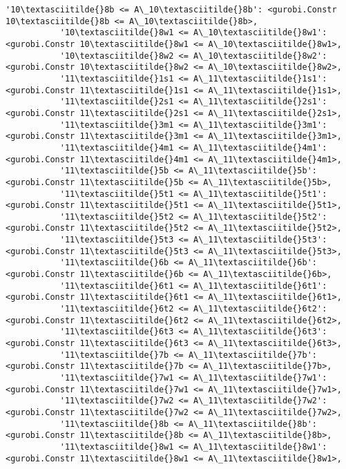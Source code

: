 \documentclass[11pt]{article}
\begin{document}
\begin{Verbatim}[commandchars=\\\{\}]
           '10\textasciitilde{}8b <= A\_10\textasciitilde{}8b': <gurobi.Constr 10\textasciitilde{}8b <= A\_10\textasciitilde{}8b>,
           '10\textasciitilde{}8w1 <= A\_10\textasciitilde{}8w1': <gurobi.Constr 10\textasciitilde{}8w1 <= A\_10\textasciitilde{}8w1>,
           '10\textasciitilde{}8w2 <= A\_10\textasciitilde{}8w2': <gurobi.Constr 10\textasciitilde{}8w2 <= A\_10\textasciitilde{}8w2>,
           '11\textasciitilde{}1s1 <= A\_11\textasciitilde{}1s1': <gurobi.Constr 11\textasciitilde{}1s1 <= A\_11\textasciitilde{}1s1>,
           '11\textasciitilde{}2s1 <= A\_11\textasciitilde{}2s1': <gurobi.Constr 11\textasciitilde{}2s1 <= A\_11\textasciitilde{}2s1>,
           '11\textasciitilde{}3m1 <= A\_11\textasciitilde{}3m1': <gurobi.Constr 11\textasciitilde{}3m1 <= A\_11\textasciitilde{}3m1>,
           '11\textasciitilde{}4m1 <= A\_11\textasciitilde{}4m1': <gurobi.Constr 11\textasciitilde{}4m1 <= A\_11\textasciitilde{}4m1>,
           '11\textasciitilde{}5b <= A\_11\textasciitilde{}5b': <gurobi.Constr 11\textasciitilde{}5b <= A\_11\textasciitilde{}5b>,
           '11\textasciitilde{}5t1 <= A\_11\textasciitilde{}5t1': <gurobi.Constr 11\textasciitilde{}5t1 <= A\_11\textasciitilde{}5t1>,
           '11\textasciitilde{}5t2 <= A\_11\textasciitilde{}5t2': <gurobi.Constr 11\textasciitilde{}5t2 <= A\_11\textasciitilde{}5t2>,
           '11\textasciitilde{}5t3 <= A\_11\textasciitilde{}5t3': <gurobi.Constr 11\textasciitilde{}5t3 <= A\_11\textasciitilde{}5t3>,
           '11\textasciitilde{}6b <= A\_11\textasciitilde{}6b': <gurobi.Constr 11\textasciitilde{}6b <= A\_11\textasciitilde{}6b>,
           '11\textasciitilde{}6t1 <= A\_11\textasciitilde{}6t1': <gurobi.Constr 11\textasciitilde{}6t1 <= A\_11\textasciitilde{}6t1>,
           '11\textasciitilde{}6t2 <= A\_11\textasciitilde{}6t2': <gurobi.Constr 11\textasciitilde{}6t2 <= A\_11\textasciitilde{}6t2>,
           '11\textasciitilde{}6t3 <= A\_11\textasciitilde{}6t3': <gurobi.Constr 11\textasciitilde{}6t3 <= A\_11\textasciitilde{}6t3>,
           '11\textasciitilde{}7b <= A\_11\textasciitilde{}7b': <gurobi.Constr 11\textasciitilde{}7b <= A\_11\textasciitilde{}7b>,
           '11\textasciitilde{}7w1 <= A\_11\textasciitilde{}7w1': <gurobi.Constr 11\textasciitilde{}7w1 <= A\_11\textasciitilde{}7w1>,
           '11\textasciitilde{}7w2 <= A\_11\textasciitilde{}7w2': <gurobi.Constr 11\textasciitilde{}7w2 <= A\_11\textasciitilde{}7w2>,
           '11\textasciitilde{}8b <= A\_11\textasciitilde{}8b': <gurobi.Constr 11\textasciitilde{}8b <= A\_11\textasciitilde{}8b>,
           '11\textasciitilde{}8w1 <= A\_11\textasciitilde{}8w1': <gurobi.Constr 11\textasciitilde{}8w1 <= A\_11\textasciitilde{}8w1>,

\end{Verbatim}
\end{document}
